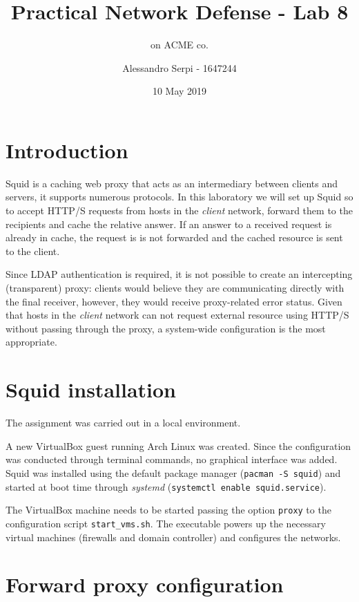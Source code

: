 \documentclass[draft]{homework}
\title{Practical Network Defense - Lab 8}
\subtitle{\sq on ACME co.}
\author{Alessandro Serpi - 1647244}
\date{10 May 2019}
\newcommand{\sq}{Squid\xspace}
\newcommand{\vb}{VirtualBox\xspace}
\begin{document}
    \maketitle
    \tableofcontents
    
    
    \pagebreak
    \section{Introduction}
    \sq is a caching web proxy that acts as an intermediary between clients and servers, it supports numerous protocols.
    In this laboratory we will set up \sq so to accept HTTP/S requests from hosts in the \textit{client} network, forward them to the recipients and cache the relative answer.
    If an answer to a received request is already in cache, the request is is not forwarded and the cached resource is sent to the client.
    
    Since LDAP authentication is required, it is not possible to create an intercepting (transparent) proxy: clients would believe they are communicating directly with the final receiver, however, they would receive proxy-related error status.
    Given that hosts in the \textit{client} network can not request external resource using HTTP/S without passing through the proxy, a system-wide configuration is the most appropriate.
    
    
    \section{\sq installation}
    The assignment was carried out in a local environment.
    
    A new \vb guest running Arch Linux was created.
    Since the configuration was conducted through terminal commands, no graphical interface was added.
    Squid was installed using the default package manager (\texttt{pacman -S squid}) and started at boot time through \textit{systemd} (\texttt{systemctl enable squid.service}).
    
    The \vb machine needs to be started passing the option \texttt{proxy} to the configuration script \texttt{start\_vms.sh}.
    The executable powers up the necessary virtual machines (firewalls and domain controller) and configures the networks.
    
    
    \section{Forward proxy configuration}
\end{document}

